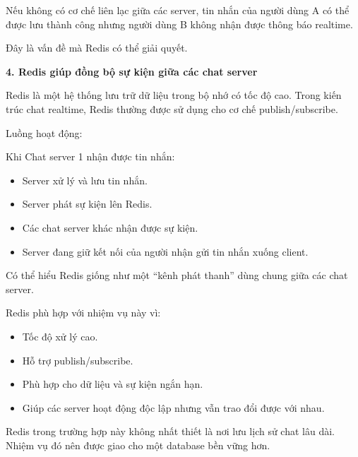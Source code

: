 Nếu không có cơ chế liên lạc giữa các server, tin nhắn của người dùng A
có thể được lưu thành công nhưng người dùng B không nhận được thông báo
realtime.

Đây là vấn đề mà Redis có thể giải quyết.

\vspace{0.5em}\noindent\textbf{4. Redis giúp đồng bộ sự kiện giữa các chat
server}\par

Redis là một hệ thống lưu trữ dữ liệu trong bộ nhớ có tốc độ cao. Trong
kiến trúc chat realtime, Redis thường được sử dụng cho cơ chế
publish/subscribe.

Luồng hoạt động:

\begin{Shaded}
\begin{Highlighting}[]
\end{Highlighting}
\end{Shaded}

Khi Chat server 1 nhận được tin nhắn:

\begin{itemize}
\tightlist
\item
  Server xử lý và lưu tin nhắn.
\item
  Server phát sự kiện lên Redis.
\item
  Các chat server khác nhận được sự kiện.
\item
  Server đang giữ kết nối của người nhận gửi tin nhắn xuống client.
\end{itemize}

Có thể hiểu Redis giống như một ``kênh phát thanh'' dùng chung giữa các
chat server.

Redis phù hợp với nhiệm vụ này vì:

\begin{itemize}
\tightlist
\item
  Tốc độ xử lý cao.
\item
  Hỗ trợ publish/subscribe.
\item
  Phù hợp cho dữ liệu và sự kiện ngắn hạn.
\item
  Giúp các server hoạt động độc lập nhưng vẫn trao đổi được với nhau.
\end{itemize}

Redis trong trường hợp này không nhất thiết là nơi lưu lịch sử chat lâu
dài. Nhiệm vụ đó nên được giao cho một database bền vững hơn.

